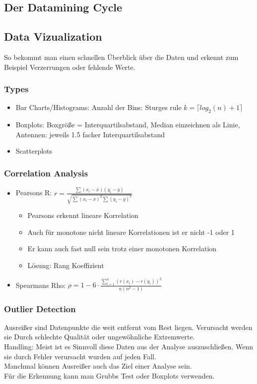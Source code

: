 \documentclass[a4paper]{scrartcl}
\begin{document}
\subsection{Der Datamining Cycle}

\subsection{Data Vizualization}
So bekommt man einen schnellen Überblick über die Daten und erkennt zum Beispiel Verzerrungen oder fehlende Werte.

\subsubsection{Types}
\begin{itemize}
\setlength{\parskip}{-1pt}
\item Bar Charts/Histograms: Anzahl der Bins: Sturges rule $k=\lceil log_2(n)+1\rceil$
\item Boxplots: Boxgröße = Interquartilsabstand, Median einzeichnen als Linie, Antennen: jeweils 1.5 facher Interquartilsabstand
\item Scatterplots
\end{itemize}

\subsubsection{Correlation Analysis}
\begin{itemize}
\setlength{\parskip}{-1pt}
\item Pearsons R: $r=\frac{\sum(x_i-\overline{x})(y_i - \overline{y})}{\sqrt{\sum(x_i-\overline{x})^2\sum(y_i - \overline{y})^2}}$
	\begin{itemize}
		\item Pearsons erkennt lineare Korrelation
		\item Auch für monotone nicht lineare Korrelationen ist er nicht  -1 oder 1
		\item Er kann auch fast null sein trotz einer monotonen Korrelation
		\item Lösung: Rang Koeffizient
	\end{itemize}
\item Spearmans Rho: $\rho=1-6\cdot\frac{\sum\limits^n_{i=1}(r(x_i)-r(y_i))^2}{n(n^2-1)}$\\
\end{itemize}

\subsubsection{Outlier Detection}
Ausreißer sind Datenpunkte die weit entfernt vom Rest liegen. Verursacht werden sie Durch schlechte Qualität oder ungewöhnliche Extremwerte.\\
Handling: Meist ist es Sinnvoll diese Daten aus der Analyse auszuschließen. Wenn sie durch Fehler verursacht wurden auf jeden Fall.\\
Manchmal können Ausreißer auch das Ziel einer Analyse sein.\\
Für die Erkennung kann man Grubbs Test oder Boxplots verwenden.
\end{document}
